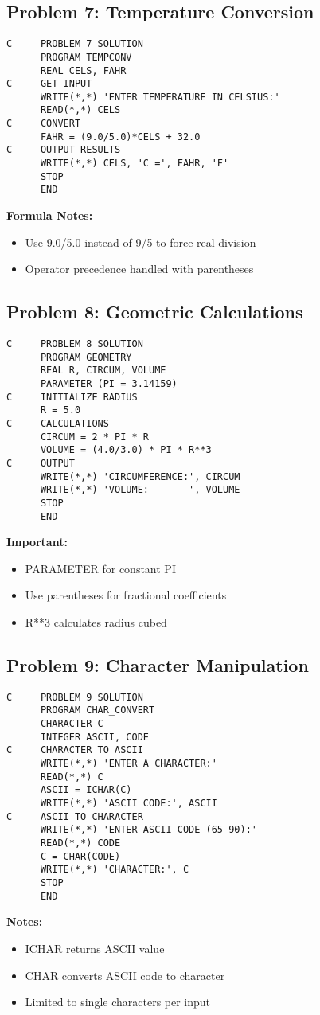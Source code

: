 \documentclass{book}
\begin{document}
\subsection*{Problem 7: Temperature Conversion}
\begin{verbatim}
C     PROBLEM 7 SOLUTION
      PROGRAM TEMPCONV
      REAL CELS, FAHR
C     GET INPUT
      WRITE(*,*) 'ENTER TEMPERATURE IN CELSIUS:'
      READ(*,*) CELS
C     CONVERT
      FAHR = (9.0/5.0)*CELS + 32.0
C     OUTPUT RESULTS
      WRITE(*,*) CELS, 'C =', FAHR, 'F'
      STOP
      END
\end{verbatim}
\textbf{Formula Notes:}
\begin{itemize}
    \item Use 9.0/5.0 instead of 9/5 to force real division
    \item Operator precedence handled with parentheses
\end{itemize}

\subsection*{Problem 8: Geometric Calculations}
\begin{verbatim}
C     PROBLEM 8 SOLUTION
      PROGRAM GEOMETRY
      REAL R, CIRCUM, VOLUME
      PARAMETER (PI = 3.14159)
C     INITIALIZE RADIUS
      R = 5.0
C     CALCULATIONS
      CIRCUM = 2 * PI * R
      VOLUME = (4.0/3.0) * PI * R**3
C     OUTPUT
      WRITE(*,*) 'CIRCUMFERENCE:', CIRCUM
      WRITE(*,*) 'VOLUME:       ', VOLUME
      STOP
      END
\end{verbatim}
\textbf{Important:}
\begin{itemize}
    \item PARAMETER for constant PI
    \item Use parentheses for fractional coefficients
    \item R**3 calculates radius cubed
\end{itemize}

\subsection*{Problem 9: Character Manipulation}
\begin{verbatim}
C     PROBLEM 9 SOLUTION
      PROGRAM CHAR_CONVERT
      CHARACTER C
      INTEGER ASCII, CODE
C     CHARACTER TO ASCII
      WRITE(*,*) 'ENTER A CHARACTER:'
      READ(*,*) C
      ASCII = ICHAR(C)
      WRITE(*,*) 'ASCII CODE:', ASCII
C     ASCII TO CHARACTER
      WRITE(*,*) 'ENTER ASCII CODE (65-90):'
      READ(*,*) CODE
      C = CHAR(CODE)
      WRITE(*,*) 'CHARACTER:', C
      STOP
      END
\end{verbatim}
\textbf{Notes:}
\begin{itemize}
    \item ICHAR returns ASCII value
    \item CHAR converts ASCII code to character
    \item Limited to single characters per input
\end{itemize}
\end{document}
